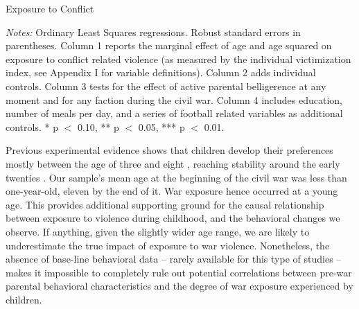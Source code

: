 \clearpage

\begin{threeparttable}[p!]
	\caption{Exposure to Conflict}
	\label{tab:slf:conflictexposure}
	\centering
	\tiny
	
	\begin{tablenotes}
		\item \textit{Notes:} Ordinary Least Squares regressions. Robust standard errors in parentheses. Column 1 reports the marginal effect of age and age squared on exposure to conflict related violence (as measured by the individual victimization index, see Appendix I for variable definitions). Column 2 adds individual controls. Column 3 tests for the effect of active parental belligerence at any moment and for any faction during the civil war. Column 4 includes education, number of meals per day, and a series of football related variables as additional controls.  * p $<$ 0.10, ** p $<$ 0.05, *** p $<$ 0.01.
		\item
	\end{tablenotes}
\end{threeparttable}

Previous experimental evidence shows that children develop their preferences mostly between the age of three and eight \citep{Benenson2007,Fehr2008}, reaching stability around the early twenties \citep{Sutter2007a}. Our sample’s mean age at the beginning of the civil war was less than one-year-old, eleven by the end of it. War exposure hence occurred at a young age. This provides additional supporting ground for the causal relationship between exposure to violence during childhood, and the behavioral changes we observe. If anything, given the slightly wider age range, we are likely to underestimate the true impact of exposure to war violence. Nonetheless, the absence of base-line behavioral data – rarely available for this type of studies – makes it impossible to completely rule out potential correlations between pre-war parental behavioral characteristics and the degree of war exposure experienced by children. 

